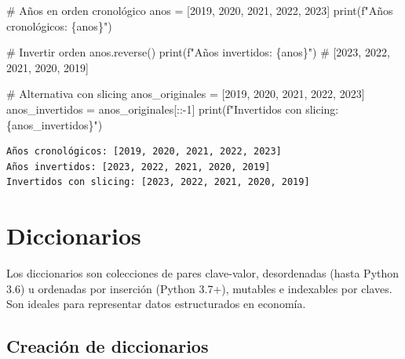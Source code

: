 \documentclass[
  doc,
  floatsintext,
  longtable,
  a4paper,
  nolmodern,
  notxfonts,
  notimes,
  12pt,
  colorlinks=true,linkcolor=blue,citecolor=blue,urlcolor=blue]{apa7}
\newenvironment{Shaded}{\begin{snugshade}}{\end{snugshade}}
\newcommand{\BuiltInTok}[1]{\textcolor[rgb]{0.00,0.23,0.31}{#1}}
\newcommand{\CommentTok}[1]{\textcolor[rgb]{0.37,0.37,0.37}{#1}}
\newcommand{\DecValTok}[1]{\textcolor[rgb]{0.68,0.00,0.00}{#1}}
\newcommand{\NormalTok}[1]{\textcolor[rgb]{0.00,0.23,0.31}{#1}}
\newcommand{\OperatorTok}[1]{\textcolor[rgb]{0.37,0.37,0.37}{#1}}
\newcommand{\SpecialCharTok}[1]{\textcolor[rgb]{0.37,0.37,0.37}{#1}}
\newcommand{\SpecialStringTok}[1]{\textcolor[rgb]{0.13,0.47,0.30}{#1}}
\begin{document}
\begin{Shaded}
\begin{Highlighting}[]
\CommentTok{\# Años en orden cronológico}
\NormalTok{anos }\OperatorTok{=}\NormalTok{ [}\DecValTok{2019}\NormalTok{, }\DecValTok{2020}\NormalTok{, }\DecValTok{2021}\NormalTok{, }\DecValTok{2022}\NormalTok{, }\DecValTok{2023}\NormalTok{]}
\BuiltInTok{print}\NormalTok{(}\SpecialStringTok{f"Años cronológicos: }\SpecialCharTok{\{}\NormalTok{anos}\SpecialCharTok{\}}\SpecialStringTok{"}\NormalTok{)}

\CommentTok{\# Invertir orden}
\NormalTok{anos.reverse()}
\BuiltInTok{print}\NormalTok{(}\SpecialStringTok{f"Años invertidos: }\SpecialCharTok{\{}\NormalTok{anos}\SpecialCharTok{\}}\SpecialStringTok{"}\NormalTok{)}
\CommentTok{\# [2023, 2022, 2021, 2020, 2019]}

\CommentTok{\# Alternativa con slicing}
\NormalTok{anos\_originales }\OperatorTok{=}\NormalTok{ [}\DecValTok{2019}\NormalTok{, }\DecValTok{2020}\NormalTok{, }\DecValTok{2021}\NormalTok{, }\DecValTok{2022}\NormalTok{, }\DecValTok{2023}\NormalTok{]}
\NormalTok{anos\_invertidos }\OperatorTok{=}\NormalTok{ anos\_originales[::}\OperatorTok{{-}}\DecValTok{1}\NormalTok{]}
\BuiltInTok{print}\NormalTok{(}\SpecialStringTok{f"Invertidos con slicing: }\SpecialCharTok{\{}\NormalTok{anos\_invertidos}\SpecialCharTok{\}}\SpecialStringTok{"}\NormalTok{)}
\end{Highlighting}
\end{Shaded}

\begin{verbatim}
Años cronológicos: [2019, 2020, 2021, 2022, 2023]
Años invertidos: [2023, 2022, 2021, 2020, 2019]
Invertidos con slicing: [2023, 2022, 2021, 2020, 2019]
\end{verbatim}

\section{Diccionarios}\label{diccionarios}

Los diccionarios son colecciones de pares clave-valor, desordenadas
(hasta Python 3.6) u ordenadas por inserción (Python 3.7+), mutables e
indexables por claves. Son ideales para representar datos estructurados
en economía.

\subsection{Creación de diccionarios}\label{creaciuxf3n-de-diccionarios}
\end{document}
